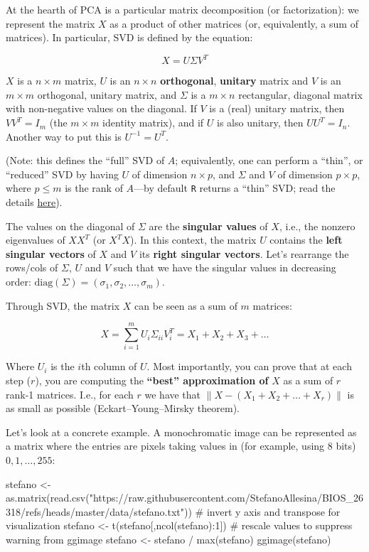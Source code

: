 \documentclass[
  letterpaper,
  DIV=11,
  numbers=noendperiod]{scrreprt}
\newenvironment{Shaded}{\begin{snugshade}}{\end{snugshade}}
\newcommand{\NormalTok}[1]{\textcolor[rgb]{0.00,0.23,0.31}{#1}}
\begin{document}
At the hearth of PCA is a particular matrix decomposition (or
factorization): we represent the matrix \(X\) as a product of other
matrices (or, equivalently, a sum of matrices). In particular, SVD is
defined by the equation:

\[
X = U \Sigma V^T
\]

\(X\) is a \(n \times m\) matrix, \(U\) is an \(n \times n\)
\textbf{orthogonal}, \textbf{unitary} matrix and \(V\) is an
\(m \times m\) orthogonal, unitary matrix, and \(\Sigma\) is a
\(m \times n\) rectangular, diagonal matrix with non-negative values on
the diagonal. If \(V\) is a (real) unitary matrix, then \(VV^T = I_m\)
(the \(m \times m\) identity matrix), and if \(U\) is also unitary, then
\(UU^T = I_n\). Another way to put this is \(U^{-1} = U^T\).

(Note: this defines the ``full'' SVD of \(A\); equivalently, one can
perform a ``thin'', or ``reduced'' SVD by having \(U\) of dimension
\(n \times p\), and \(\Sigma\) and \(V\) of dimension \(p \times p\),
where \(p \leq m\) is the rank of \(A\)---by default \texttt{R} returns
a ``thin'' SVD; read the details
\href{http://www.seas.ucla.edu/~vandenbe/133B/lectures/svd.pdf}{here}).

The values on the diagonal of \(\Sigma\) are the \textbf{singular
values} of \(X\), i.e., the nonzero eigenvalues of \(XX^T\) (or
\(X^T X\)). In this context, the matrix \(U\) contains the \textbf{left
singular vectors} of \(X\) and \(V\) its \textbf{right singular
vectors}. Let's rearrange the rows/cols of \(\Sigma\), \(U\) and \(V\)
such that we have the singular values in decreasing order:
\(\text{diag}(\Sigma) = (\sigma_1, \sigma_2, \ldots, \sigma_m)\).

Through SVD, the matrix \(X\) can be seen as a sum of \(m\) matrices:

\[
X = \sum_{i = 1}^m U_i \Sigma_{ii} V_i^T = X_1 + X_2 + X_3 + \ldots
\]

Where \(U_i\) is the \(i\)th column of \(U\). Most importantly, you can
prove that at each step (\(r\)), you are computing the \textbf{``best''
approximation of} \(X\) as a sum of \(r\) rank-1 matrices. I.e., for
each \(r\) we have that \(\| X - (X_1 + X_2 + \ldots + X_r) \|\) is as
small as possible (Eckart--Young--Mirsky theorem).

Let's look at a concrete example. A monochromatic image can be
represented as a matrix where the entries are pixels taking values in
(for example, using 8 bits) \(0, 1, \ldots, 255\):

\begin{Shaded}
\begin{Highlighting}[]
\NormalTok{stefano \textless{}{-} as.matrix(read.csv("https://raw.githubusercontent.com/StefanoAllesina/BIOS\_26318/refs/heads/master/data/stefano.txt"))}
\NormalTok{\# invert y axis and transpose for visualization}
\NormalTok{stefano \textless{}{-} t(stefano[,ncol(stefano):1])}
\NormalTok{\# rescale values to suppress warning from ggimage}
\NormalTok{stefano \textless{}{-} stefano / max(stefano)}
\NormalTok{ggimage(stefano)}
\end{Highlighting}
\end{Shaded}
\end{document}
